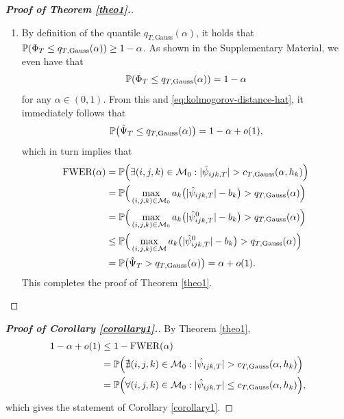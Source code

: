 \documentclass[a4paper,12pt]{article}
\numberwithin{equation}{section}
\begin{document}
\begin{proof}[\textnormal{\textbf{Proof of Theorem \ref{theo1}.}}]
\begin{enumerate}[label=\textit{Step \arabic*.}, leftmargin=0cm, itemindent=1.45cm]
\item By definition of the quantile $q_{T,\text{Gauss}}(\alpha)$, it holds that $\mathbb{P}(\Phi_T \le q_{T,\text{Gauss}}(\alpha)) \ge 1-\alpha$. As shown in the Supplementary Material, we even have that  
\begin{equation}\label{eq:quant-exact}
\mathbb{P}(\Phi_T \le q_{T,\text{Gauss}}(\alpha)) = 1-\alpha
\end {equation} 
for any $\alpha \in (0,1)$. From this and \eqref{eq:kolmogorov-distance-hat}, it immediately follows that  
\begin{equation}\label{eq:probbound-Psihat}
\mathbb{P} \big( \hat{\Psi}_T \le q_{T,\text{Gauss}}(\alpha) \big) = 1 - \alpha + o(1), 
\end{equation}
which in turn implies that 
\begin{align*}
\text{FWER}(\alpha)
 & = \mathbb{P} \Big( \exists (i,j,k) \in \mathcal{M}_0: |\hat{\psi}_{ijk,T}| > c_{T,\text{Gauss}}(\alpha,h_k) \Big) \\
 & = \mathbb{P} \Big( \max_{(i,j,k) \in \mathcal{M}_0} a_k \big( |\hat{\psi}_{ijk,T}| - b_k \big) > q_{T,\text{Gauss}}(\alpha) \Big) \\
 & = \mathbb{P} \Big( \max_{(i,j,k) \in \mathcal{M}_0} a_k \big( |\hat{\psi}_{ijk,T}^0| - b_k \big) > q_{T,\text{Gauss}}(\alpha) \Big) \\
 & \le \mathbb{P} \Big( \max_{(i,j,k) \in \mathcal{M}} a_k \big( |\hat{\psi}_{ijk,T}^0| - b_k \big) > q_{T,\text{Gauss}}(\alpha) \Big) \\
 & = \mathbb{P} \big( \hat{\Psi}_T > q_{T,\text{Gauss}}(\alpha) \big) = \alpha + o(1).
\end{align*}
This completes the proof of Theorem \ref{theo1}. \qedhere


\end{enumerate}
\end{proof}


\begin{proof}[\textnormal{\textbf{Proof of Corollary \ref{corollary1}.}}]
By Theorem \ref{theo1}, 
\begin{align*}
1 - \alpha + o(1) 
 & \le 1 - \textnormal{FWER}(\alpha) \\
 & = \mathbb{P} \Big( \nexists (i,j,k) \in \mathcal{M}_0: |\hat{\psi}_{ijk,T}| > c_{T,\textnormal{Gauss}}(\alpha,h_k) \Big) \\
& = \mathbb{P}\Big( \forall (i,j,k) \in \mathcal{M}_0: |\hat{\psi}_{ijk,T}| \le c_{T,\textnormal{Gauss}}(\alpha,h_k) \Big),
\end{align*}
which gives the statement of Corollary \ref{corollary1}.
\end{proof}
\end{document}
